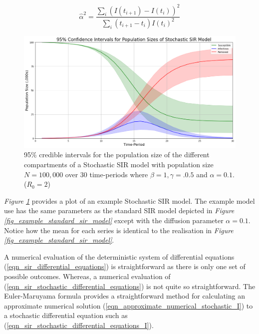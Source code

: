 \documentclass[11pt,a4paper]{article}
\theoremstyle{break}
\begin{document}
  \begin{equation}\label{eqn_estimate_alpha}
    \hat\alpha^2=\frac{\sum_i\left(I(t_{i+1})-I(t_i)\right)^2}{\sum_i\left(t_{i+1}-t_i\right)I(t_i)^2}
  \end{equation}

  \begin{figure}[H]
    \centering\includegraphics[width=.9\textwidth]{example_stochastic_sir_model.png}
    \caption{95\% credible intervals for the population size of the different compartments of a Stochastic SIR model with population size $N=100,000$ over 30 time-periods where $\beta=1,\gamma=.0.5$ and $\alpha=0.1$. ($R_0=2$)}
    \label{fig_example_stochastic_sir_model}
  \end{figure}

  \par \textit{Figure \ref{fig_example_stochastic_sir_model}} provides a plot of an example Stochastic SIR model. The example model use has the same parameters as the standard SIR model depicted in \textit{Figure \ref{fig_example_standard_sir_model}} except with the diffusion parameter $\alpha=0.1$. Notice how the mean for each series is identical to the realisation in \textit{Figure \ref{fig_example_standard_sir_model}}.

  \par A numerical evaluation of the deterministic system of differential equations (\ref{eqn_sir_differential_equations}) is straightforward as there is only one set of possible outcomes. Whereas, a numerical evaluation of (\ref{eqn_sir_stochastic_differential_equations}) is not quite so straightforward. The Euler-Maruyama formula \cite[]{on_one_step_method_of_euler_maruyama} provides a straightforward method for calculating an approximate numerical solution (\ref{eqn_approximate_numerical_stochastic_I}) to a stochastic differential equation such as (\ref{eqn_sir_stochastic_differential_equations_I}).
\end{document}
